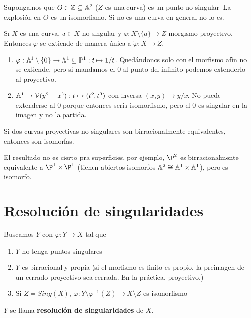 \documentclass[ACGA.tex]{subfiles}
\begin{document}
\begin{prop}
Supongamos que $O\in\mathbb{Z}\subseteq\mathbb{A}^2$ ($Z$ es una curva) es un punto no singular. La explosión en $O$ es un isomorfismo. Si no es una curva en general no lo es. 
\end{prop}

\begin{prop}
Si $X$ es una curva, $a\in X$ no singular y $\varphi:X\setminus\{a\}\to Z$ morgismo proyectivo. Entonces $\varphi$ se extiende de manera única a $\tilde{\varphi}:X\to Z$. 
\end{prop}

\begin{ejs}
\begin{enumerate}
\item $\varphi:\mathbb{A}^1\setminus\{0\}\to \mathbb{A}^1\subseteq\mathbb{P}^1:t\mapsto 1/t$. Quedándonos solo con el morfismo afín no se extiende, pero si mandamos el 0 al punto del infinito podemos extenderlo al proyectivo. 
\item $\mathbb{A}^1\to\mathcal{V}(y^2-x^3): t\mapsto (t^2,t^3)$ con inversa $(x,y)\mapsto y/x$. No puede extenderse al 0 porque entonces sería isomorfismo, pero el 0 es singular en la imagen y no la partida.
\end{enumerate}
\end{ejs}

\begin{prop}
Si dos curvas proyectivas no singulares son birracionalmente equivalentes, entonces son isomorfas.
\end{prop}

El resultado no es cierto pra superficies, por ejemplo, $\P^2$ es birracionalmente equivalente a $\P^1\times\P^1$ (tienen abiertos isomorfos $\mathbb{A}^2\cong\mathbb{A}^1\times\mathbb{A}^1$), pero es isomorfo.



\section{Resolución de singularidades}

Buscamos $Y$ con $\varphi:Y\to X$ tal que 
\begin{enumerate}
\item $Y$ no tenga puntos singulares
\item $Y$ es birracional y propia (si el morfismo es finito es propio, la preimagen de un cerrado proyectivo sea cerrada. En la práctica, proyectivo.)
\item Si $Z=Sing(X)$, $\varphi:Y\setminus\varphi^{-1}(Z)\to X\setminus Z$ es isomorfismo
\end{enumerate}
$Y$ se llama \textbf{resolución de singularidades} de $X$.
\end{document}
